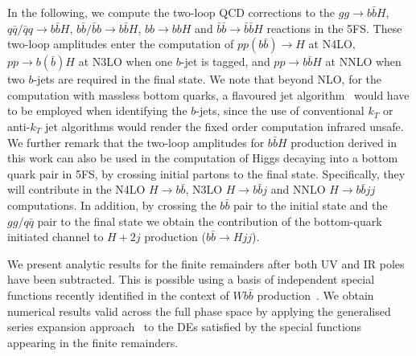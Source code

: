 \documentclass[main.tex]{subfiles}
\begin{document}
In the following, we compute the two-loop QCD corrections to the $gg \rightarrow b\bar{b}H$,
$q\bar{q}/\bar{q}q \rightarrow b\bar{b}H$, $b\bar{b}/\bar{b}b\rightarrow b\bar{b}H$, $bb \rightarrow
bbH$ and $\bar{b}\bar{b}\rightarrow\bar{b}\bar{b}H$ reactions in the 5FS. These two-loop amplitudes
enter the computation of $pp(b\bar{b})\to H$ at N4LO, $pp\to b(\bar{b})H$ at N3LO when one $b$-jet
is tagged, and $pp\to b\bar{b}H$ at NNLO when two $b$-jets are required in the final state.  We note
that beyond NLO, for the computation with massless bottom quarks, a flavoured jet
algorithm~\cite{Banfi:2006hf} would have to be employed when identifying the $b$-jets, since the use
of conventional $k_T$ or anti-$k_T$ jet algorithms would render the fixed order computation infrared
unsafe.  We further remark that the two-loop amplitudes for $b\bar{b}H$ production derived in this
work can also be used in the computation of Higgs decaying into a bottom quark pair in 5FS, by
crossing initial partons to the final state. Specifically, they will contribute in the N4LO $H\to
b\bar{b}$, N3LO $H\to b\bar{b}j$ and NNLO $H\to b\bar{b}jj$ computations.  In addition, by crossing
the $b\bar{b}$ pair to the initial state and the $gg/q\bar{q}$ pair to the final state we obtain the
contribution of the bottom-quark initiated channel to $H+2j$ production ($b\bar{b}\to Hjj$).

We present analytic results for the finite remainders after both UV and IR poles have been subtracted. This is possible using a basis of independent special functions recently identified in the context
of $Wb\bar{b}$ production~\cite{Badger:2021nhg}. We obtain numerical results valid across the full phase
space by applying the generalised series expansion approach~\cite{Francesco:2019yqt,Abreu:2020jxa,Hidding:2020ytt} to the DEs satisfied by the special functions appearing in the finite remainders.
\end{document}
